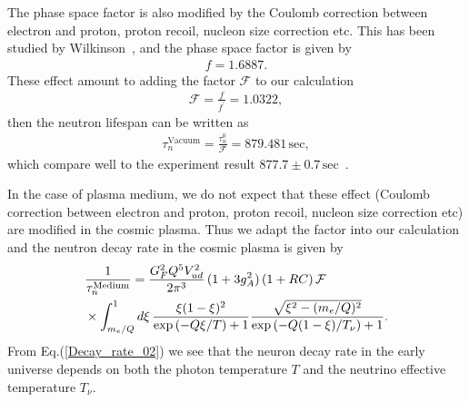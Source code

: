 The phase space factor is also modified by the Coulomb correction between electron and proton, proton recoil, nucleon size correction etc. This has been studied by Wilkinson~\cite{Wilkinson:1982hu}, and the phase space factor is given by~\cite{Czarnecki:2018okw,Czarnecki:2004cw,Wilkinson:1982hu}
\begin{align}
f=1.6887.
\end{align}
These effect amount to adding the factor $\mathcal{F}$ to our calculation
\begin{align}
\mathcal{F}=\frac{f}{f^\prime}=1.0322,
\end{align}
then the neutron lifespan can be written as 
\begin{align}
\tau^{\mathrm{Vacuum}}_n=\frac{\tau^0_n}{\mathcal{F}}=879.481\,\mathrm{sec},
\end{align}
which compare well to the experiment result $877.7\pm0.7\,\mathrm{sec}$~\cite{Pattie:2017vsj}. 

In the case of plasma medium, we do not expect that these effect (Coulomb correction between electron and proton, proton recoil, nucleon size correction etc) are modified in the cosmic plasma. Thus we adapt the factor into our calculation and the neutron decay rate in the cosmic plasma is given by
\begin{align}
\label{Decay_rate_02}
&\frac{1}{\tau_n^{\mathrm{Medium}}}=\frac{G^2_FQ^5V^2_{ud}}{2\pi^3}\,(1+3g^2_A)\,(1+RC)\,\mathcal{F}\\
&\times\int^1_{m_e/Q}d\xi\,\frac{\xi(1-\xi)^2}{\exp\left(-Q\xi/{T}\right)+1}\frac{\sqrt{\xi^2-(m_e/Q)^2}}{\exp\left(-Q(1-\xi)/T_\nu\right)+1}.\notag
\end{align}
From Eq.(\ref{Decay_rate_02}) we see that the neuron decay rate in the early universe depends on both the photon temperature $T$ and the neutrino effective temperature $T_\nu$.

